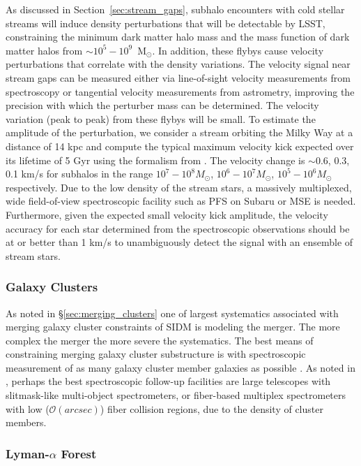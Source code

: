 As discussed in Section~\ref{sec:stream_gaps}, subhalo encounters with cold stellar streams will induce density perturbations that will be detectable by LSST, constraining the minimum dark matter halo mass and the mass function of dark matter halos from $\sim10^{5} - 10^{9}$~M$_{\odot}$. In addition, these flybys cause velocity perturbations that correlate with the density variations.  The velocity signal near stream gaps can be measured either via line-of-sight velocity measurements from spectroscopy or tangential velocity measurements from astrometry, improving the precision with which the perturber mass can be determined.
The velocity variation (peak to peak) from these flybys will be small. To estimate the amplitude of the perturbation, we consider a stream orbiting the Milky Way at a distance of 14 kpc and compute the typical maximum velocity kick expected over its lifetime of 5 Gyr using the formalism from \cite{erkal2016}.  The velocity change is $\sim$0.6, 0.3, 0.1 km/s for subhalos in the range $10^7-10^8 M_\odot$, $10^6-10^7 M_\odot$, $10^5 -10^6 M_\odot$ respectively. Due to the low density of the stream stars, a massively multiplexed, wide field-of-view spectroscopic facility such as PFS on Subaru or MSE is needed. Furthermore, given the expected small velocity kick amplitude, the velocity accuracy for each star determined from the spectroscopic observations should be at or better than 1 km/s to unambiguously detect the signal with an ensemble of stream stars.

\subsubsection{Galaxy Clusters }
As noted in \S\ref{sec:merging_clusters} one of largest systematics associated with merging galaxy cluster constraints of SIDM is modeling the merger. The more complex the merger the more severe the systematics.
The best means of constraining merging galaxy cluster substructure is with spectroscopic measurement of as many galaxy cluster member galaxies as possible \cite[see e.g.,][]{2018arXiv180610619G}.
As noted in \cite{2016arXiv161001661N}, perhaps the best spectroscopic follow-up facilities are large telescopes with slitmask-like multi-object spectrometers, or fiber-based multiplex spectrometers with low ($\mathcal{O}(arcsec)$) fiber collision regions, due to the density of cluster members.


\subsubsection{Lyman-$\alpha$ Forest }

